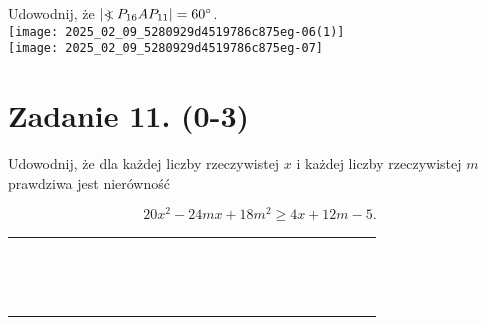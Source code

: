 \documentclass[10pt]{article}
\newcommand\Varangle{\mathop{{<\!\!\!\!\!\text{\small)}}\:}\nolimits}
\begin{document}
Udowodnij, że \(\left|\Varangle P_{16} A P_{11}\right|=60^{\circ}\).\\
\texttt{[image: 2025\_02\_09\_5280929d4519786c875eg-06(1)]}\\
\texttt{[image: 2025\_02\_09\_5280929d4519786c875eg-07]}

\section*{Zadanie 11. (0-3)}
Udowodnij, że dla każdej liczby rzeczywistej \(x\) i każdej liczby rzeczywistej \(m\) prawdziwa jest nierówność

\[
20 x^{2}-24 m x+18 m^{2} \geq 4 x+12 m-5 .
\]

\begin{center}
\begin{tabular}{|c|c|c|c|c|c|c|c|c|c|c|c|c|c|c|c|c|c|c|c|c|c|c|}
\hline
 &  &  &  &  &  &  &  &  &  &  &  &  &  &  &  &  &  &  &  &  &  &  \\
\hline
 &  &  &  &  &  &  &  &  &  &  &  &  &  &  &  &  &  &  &  &  &  &  \\
\hline
 &  &  &  &  &  &  &  &  &  &  &  &  &  &  &  &  &  &  &  &  &  &  \\
\hline
 &  &  &  &  &  &  &  &  &  &  &  &  &  &  &  &  &  &  &  &  &  &  \\
\hline
 &  &  &  &  &  &  &  &  &  &  &  &  &  &  &  &  &  &  &  &  &  &  \\
\hline
 &  &  &  &  &  &  &  &  &  &  &  &  &  &  &  &  &  &  &  &  &  &  \\
\hline
 &  &  &  &  &  &  &  &  &  &  &  &  &  &  &  &  &  &  &  &  &  &  \\
\hline
 &  &  &  &  &  &  &  &  &  &  &  &  &  &  &  &  &  &  &  &  &  &  \\
\hline
 &  &  &  &  &  &  &  &  &  &  &  &  &  &  &  &  &  &  &  &  &  &  \\
\hline
 &  &  &  &  &  &  &  &  &  &  &  &  &  &  &  &  &  &  &  &  &  &  \\
\hline
 &  &  &  &  &  &  &  &  &  &  &  &  &  &  &  &  &  &  &  &  &  &  \\
\hline
 &  &  &  &  &  &  &  &  &  &  &  &  &  &  &  &  &  &  &  &  &  &  \\
\hline
 &  &  &  &  &  &  &  &  &  &  &  &  &  &  &  &  &  &  &  &  &  &  \\
\hline
 &  &  &  &  &  &  &  &  &  &  &  &  &  &  &  &  &  &  &  &  &  &  \\
\hline

\end{tabular}
\end{center}
\end{document}
